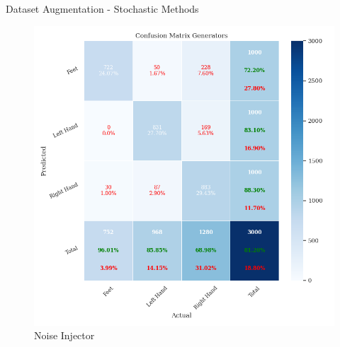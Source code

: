 \begin{frame}{Dataset Augmentation - Stochastic Methods}
    \begin{minipage}{0.49\textwidth}
        \begin{figure}[htpb!]
            \centering
            \includegraphics[width=\textwidth]{figures/augmentation/stochastic/confusion_matrix_generators_2024_03_30_18_00_20_noise_injector_using_LSTMNet_0.5943600867678959.pkl.png}
            \caption{Noise Injector}
        \end{figure}
    \end{minipage}
    \begin{minipage}{0.49\textwidth}
        \begin{figure}[htpb!]
            \centering

\end{figure}
\end{minipage}
\end{frame}
